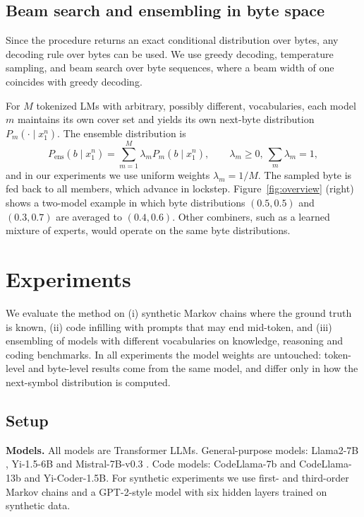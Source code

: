 \documentclass{article} %
\begin{document}
\subsection{Beam search and ensembling in byte space}
\label{sec:ensemble}
Since the procedure returns an exact conditional distribution over bytes, any decoding rule over bytes can be used. We use greedy decoding, temperature sampling, and beam search over byte sequences, where a beam width of one coincides with greedy decoding.

For $M$ tokenized LMs with arbitrary, possibly different, vocabularies, each model $m$ maintains its own cover set and yields its own next-byte distribution $P_m(\cdot\mid x_1^n)$. The ensemble distribution is
\begin{equation}
P_{\mathrm{ens}}(b\mid x_1^n)=\sum_{m=1}^{M}\lambda_m P_m(b\mid x_1^n),\qquad \lambda_m\ge0,\ \sum_m\lambda_m=1,
\end{equation}
and in our experiments we use uniform weights $\lambda_m=1/M$. The sampled byte is fed back to all members, which advance in lockstep. Figure~\ref{fig:overview} (right) shows a two-model example in which byte distributions $(0.5,0.5)$ and $(0.3,0.7)$ are averaged to $(0.4,0.6)$. Other combiners, such as a learned mixture of experts, would operate on the same byte distributions.

\section{Experiments}
\label{sec:experiments}
We evaluate the method on (i) synthetic Markov chains where the ground truth is known, (ii) code infilling with prompts that may end mid-token, and (iii) ensembling of models with different vocabularies on knowledge, reasoning and coding benchmarks. In all experiments the model weights are untouched: token-level and byte-level results come from the same model, and differ only in how the next-symbol distribution is computed.

\subsection{Setup}
\label{sec:setup}
\textbf{Models.} All models are Transformer LLMs. General-purpose models: Llama2-7B \citep{touvron2023llama}, Yi-1.5-6B \citep{young2024yi} and Mistral-7B-v0.3 \citep{jiang2023mistral}. Code models: CodeLlama-7b and CodeLlama-13b \citep{roziere2023code} and Yi-Coder-1.5B. For synthetic experiments we use first- and third-order Markov chains and a GPT-2-style model \citep{radford2019language} with six hidden layers trained on synthetic data.
\end{document}

